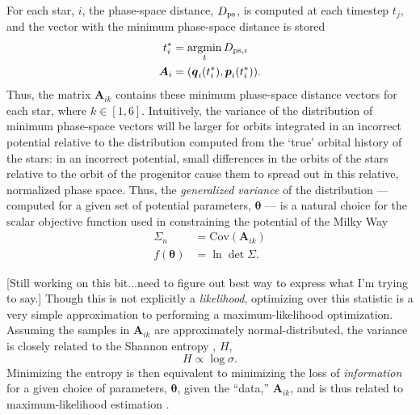 \documentclass[preprint]{aastex}
\newcommand{\bs}{\boldsymbol}
\newcommand{\argmin}{\operatornamewithlimits{argmin}}
\begin{document}

For each star, $i$,
the phase-space distance, $D_{\rm ps}$, is computed at each timestep
$t_{j}$, and the vector with the minimum phase-space distance is stored
\begin{align}
  t^*_{i} &= \argmin_{t} D_{{\rm ps},i}\\
  \bs{A}_{i} &= (\bs{q}_{i}(t^*_{i}),\bs{p}_{i}(t^*_{i})).
\end{align}
Thus, the matrix $\bs{A}_{ik}$ contains these minimum phase-space
distance vectors for each star, where $k\in[1,6]$. Intuitively, the
variance of the distribution of minimum phase-space vectors will be
larger for orbits integrated in an incorrect potential relative to the
distribution computed from the `true' orbital history of the stars: in
an incorrect potential, small differences in the orbits of the stars
relative to the orbit of the progenitor cause them to spread out in
this relative, normalized phase space. Thus, the \emph{generalized
  variance} of the distribution --- computed for a given set of
potential parameters, $\bs{\theta}$ --- is a natural choice for the
scalar objective function used in constraining the potential of the
Milky Way
\begin{align}
  \Sigma_n &= \mathrm{Cov}( \bs{A}_{ik}) \\
  f(\bs{\theta}) &= \ln \det \Sigma.
\end{align}

[Still working on this bit...need to figure out best way to express
  what I'm trying to say.] Though this is not explicitly a
\emph{likelihood}, optimizing over this statistic is a very simple
approximation to performing a maximum-likelihood
optimization. Assuming the samples in $\bs{A}_{ik}$ are approximately
normal-distributed, the variance is closely related to the Shannon
entropy \citep{shannon1948}, $H$,
\begin{equation}
  H \propto \log \sigma .
\end{equation}
Minimizing the entropy is then equivalent to minimizing the loss of
\emph{information} for a given choice of parameters, $\bs{\theta}$,
given the ``data,'' $\bs{A}_{ik}$, and is thus related to
maximum-likelihood estimation \citep[see][for more
  detail]{mackay2002}.
\end{document}
